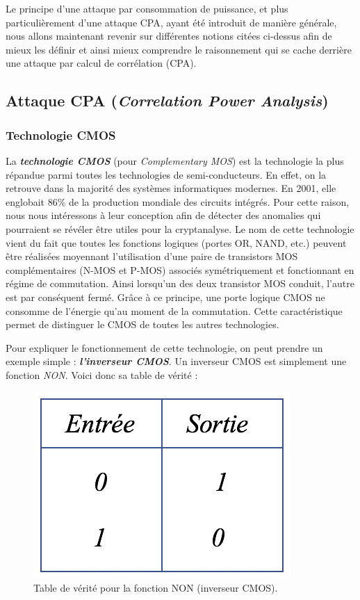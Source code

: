 \documentclass[10pt, oneside, a4paper]{article}
\begin{document}
Le principe d'une attaque par consommation de puissance, et plus particulièrement d'une attaque CPA, ayant été introduit de manière générale, nous allons maintenant revenir sur différentes notions citées ci-dessus afin de mieux les définir et ainsi mieux comprendre le raisonnement qui se cache derrière une attaque par calcul de corrélation (CPA).

\newpage

\subsection{Attaque CPA (\textit{Correlation Power Analysis})}

\subsubsection{Technologie CMOS}
\label{sec:CMOS}
La \textbf{\textit{technologie CMOS}} (pour \textit{Complementary MOS}) est la technologie la plus répandue parmi toutes les technologies de semi-conducteurs. En effet, on la retrouve dans la majorité des systèmes informatiques modernes. En 2001, elle englobait 86\% de la production mondiale des circuits intégrés. Pour cette raison, nous nous intéressons à leur conception afin de détecter des anomalies qui pourraient se révéler être utiles pour la cryptanalyse. Le nom de cette technologie vient du fait que toutes les fonctions logiques (portes OR, NAND, etc.) peuvent être réalisées moyennant l’utilisation d’une paire de transistors MOS complémentaires (N-MOS et P-MOS) associés symétriquement et fonctionnant en régime de commutation. Ainsi lorsqu'un des deux transistor MOS conduit, l’autre est par conséquent fermé. Grâce à ce principe, une porte logique CMOS ne consomme de l’énergie qu’au moment de la commutation. Cette caractéristique permet de distinguer le CMOS de toutes les autres technologies.

\hspace{-0.5 cm}Pour expliquer le fonctionnement de cette technologie, on peut prendre un exemple simple : \textbf{\textit{l'inverseur CMOS}}. Un inverseur CMOS est simplement une fonction \textit{NON}. Voici donc sa table de vérité :
\begin{figure}[htbp]
    \centering
    \includegraphics[scale=0.5]{image/verite}
    \caption{Table de vérité pour la fonction NON (inverseur CMOS).}
    \label{fig:verite} 
\end{figure}
\end{document}
